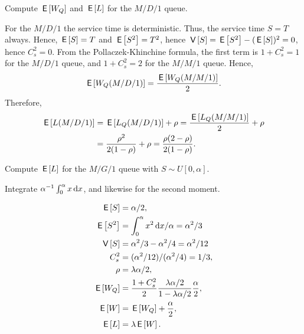 \begin{extra}
 Compute $\,\mathsf{E}\left[W_Q\right]$ and $\,\mathsf{E}\left[L\right]$ for the $M/D/1$ queue.
\begin{solution}
 For the $M/D/1$ the service time is deterministic.
 Thus, the service time $S=T$ always.
 Hence, $\,\mathsf{E}\left[S\right] = T$ and $\,\mathsf{E}\left[S^2\right]=T^2$, hence $\,\mathsf{V}\left[S\right] = \,\mathsf{E}\left[S^2\right] - (\,\mathsf{E}\left[S\right])^2 = 0$, hence $C_s^2 = 0$.
 From the Pollaczek-Khinchine formula, the first term is $1+C_s^2=1$ for the $M/D/1$ queue, and $1+C_s^2=2$ for the $M/M/1$ queue.
 Hence,
 \begin{equation*}
\,\mathsf{E}\left[W_Q(M/D/1)\right] = \frac{\,\mathsf{E}\left[W_Q(M/M/1)\right]}2.
\end{equation*}
Therefore,
\begin{align*}
 \,\mathsf{E}\left[L(M/D/1)\right] &= \,\mathsf{E}\left[L_Q(M/D/1)\right] +\rho = \frac{\,\mathsf{E}\left[L_Q(M/M/1)\right]}2 + \rho \\
&= \frac{\rho^2}{2(1-\rho)} + \rho=\frac{\rho(2-\rho)} {2(1-\rho)}.
\end{align*}
\end{solution}
\end{extra}

\begin{extra}
 Compute $\,\mathsf{E}\left[L\right]$ for the $M/G/1$ queue with $S\sim U[0,\alpha]$.
\begin{hint}
Integrate $\alpha^{-1} \int_0^\alpha x \,\text{d}x$, and likewise for the second moment.
\end{hint}
\begin{solution}
 \begin{align*}
\,\mathsf{E}\left[S\right] &= \alpha/2,\\
\,\mathsf{E}\left[S^2\right] &= \int_0^\alpha x^2 \,\text{d}x/\alpha = \alpha^2/3\\
\,\mathsf{V}\left[S\right] &= \alpha^2/3 - \alpha^2/4= \alpha^2/12\\
C_s^2 &= (\alpha^2/12)/(\alpha^2/4) = 1/3,\\
\rho &= \lambda \alpha/2,\\
\,\mathsf{E}\left[W_Q\right] &= \frac{1+C_s^2}2 \frac{\lambda \alpha/2}{1-\lambda \alpha/2}\frac \alpha2, \\
\,\mathsf{E}\left[W\right] &= \,\mathsf{E}\left[W_Q\right] + \frac \alpha2,\\
\,\mathsf{E}\left[L\right] &= \lambda \,\mathsf{E}\left[W\right].
 \end{align*}
\end{solution}
\end{extra}

